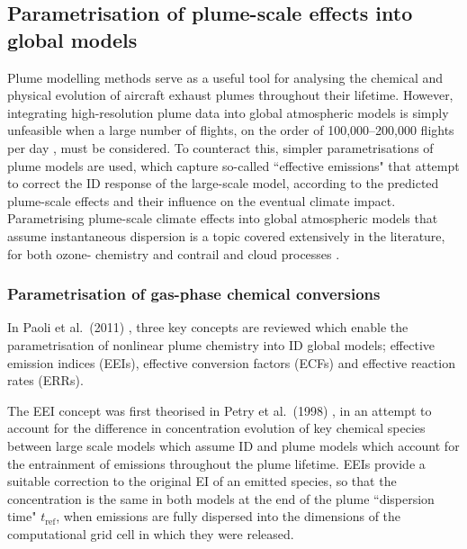 \subsection{Parametrisation of plume-scale effects into global models}
Plume modelling methods serve as a useful tool for analysing the chemical and physical evolution of aircraft exhaust plumes throughout their lifetime. However, integrating high-resolution plume data into global atmospheric models is simply unfeasible when a large number of flights, on the order of 100,000--200,000 flights per day \cite{Flightradar24}, must be considered. To counteract this, simpler parametrisations of plume models are used, which capture so-called ``effective emissions" that attempt to correct the ID response of the large-scale model, according to the predicted plume-scale effects and their influence on the eventual climate impact. Parametrising plume-scale climate effects into global atmospheric models that assume instantaneous dispersion is a topic covered extensively in the literature, for both ozone- chemistry \cite{Meijer1997, Paoli2020, Paoli2011, Cariolle2009} and contrail and cloud processes \cite{Burkhardt2009}. 

\subsubsection{Parametrisation of gas-phase chemical conversions}
In Paoli et al.\ (2011) \cite{Paoli2011}, three key concepts are reviewed which enable the parametrisation of nonlinear plume chemistry into ID global models; effective emission indices (EEIs), effective conversion factors (ECFs) and effective reaction rates (ERRs). 

The EEI concept was first theorised in Petry et al.\ (1998) \cite{Petry1998}, in an attempt to account for the difference in concentration evolution of key chemical species between large scale models which assume ID and plume models which account for the entrainment of emissions throughout the plume lifetime. EEIs provide a suitable correction to the original EI of an emitted species, so that the concentration is the same in both models at the end of the plume ``dispersion time" ${t_{\mathrm{ref}}}$, when emissions are fully dispersed into the dimensions of the computational grid cell in which they were released.  


